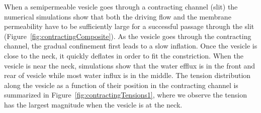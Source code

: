 \documentclass[prb,preprint,showpacs,preprintnumbers,amsmath,amssymb,longbibliography]{revtex4-1}
\begin{document}
When a semipermeable vesicle goes through a contracting channel (slit)
the numerical simulations show that both the driving flow and the
membrane permeability have to be sufficiently large for a successful
passage through the slit (Figure~\ref{fig:contractingComposite}). As
the vesicle goes through the contracting channel, the gradual
confinement first leads to a slow inflation. Once the vesicle is close
to the neck, it quickly deflates in order to fit the constriction. When
the vesicle is near the neck, simulations show that the water efflux is
in the front and rear of vesicle while most water influx is in the
middle. The tension distribution along the vesicle as a function of
their position in the contracting channel is summarized in
Figure~\ref{fig:contractingTensions1}, where we observe the
tension has the largest magnitude when the vesicle is at the neck. 
\end{document}
